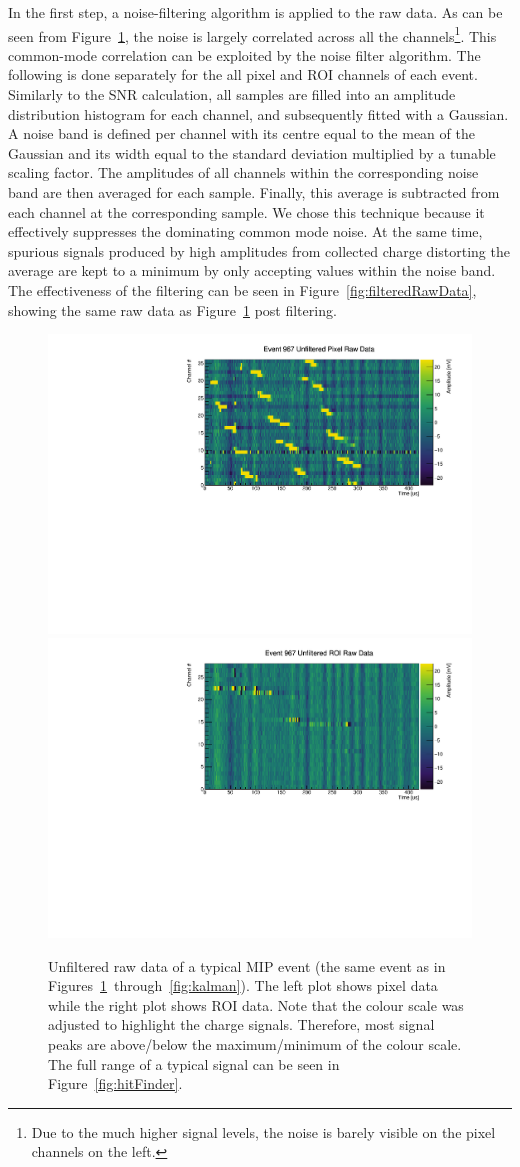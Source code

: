 \documentclass[a4paper]{article}
\begin{document}
In the first step, a noise-filtering algorithm is applied to the raw data.
As can be seen from Figure~\ref{fig:unfilteredRawData}, the noise is largely correlated across all the channels\footnote{Due to the much higher signal levels, the noise is barely visible on the pixel channels on the left.}.
This common-mode correlation can be exploited by the noise filter algorithm.
The following is done separately for the all pixel and ROI channels of each event.
Similarly to the SNR calculation, all samples are filled into an amplitude distribution histogram for each channel, and subsequently fitted with a Gaussian.
A noise band is defined per channel with its centre equal to the mean of the Gaussian and its width equal to the standard deviation multiplied by a tunable scaling factor.
The amplitudes of all channels within the corresponding noise band are then averaged for each sample.
Finally, this average is subtracted from each channel at the corresponding sample.
We chose this technique because it effectively suppresses the dominating common mode noise.
At the same time, spurious signals produced by high amplitudes from collected charge distorting the average are kept to a minimum by only accepting values within the noise band.
The effectiveness of the filtering can be seen in Figure~\ref{fig:filteredRawData}, showing the same raw data as Figure~\ref{fig:unfilteredRawData} post filtering.

\begin{figure}[htb]
	\centering
	\includegraphics[width=.49\textwidth]{event967_rawUnfilteredPixel}
	\includegraphics[width=.49\textwidth]{event967_rawUnfilteredROI}
	\caption{Unfiltered raw data of a typical MIP event (the same event as in Figures~\ref{fig:unfilteredRawData}~through~\ref{fig:kalman}).
		The left plot shows pixel data while the right plot shows ROI data.
		Note that the colour scale was adjusted to highlight the charge signals.
		Therefore, most signal peaks are above/below the maximum/minimum of the colour scale.
		The full range of a typical signal can be seen in Figure~\ref{fig:hitFinder}.}
	\label{fig:unfilteredRawData}
\end{figure}
\end{document}
